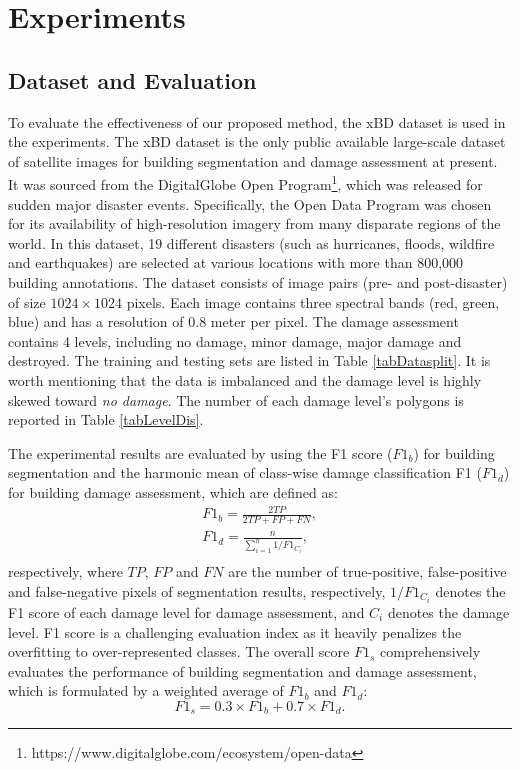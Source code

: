 \documentclass[journal]{IEEEtran}
\begin{document}
\section{Experiments}
\label{SecExp}
\subsection{Dataset and Evaluation}
To evaluate the effectiveness of our proposed method, the xBD dataset \cite{gupta2019xbd} is used in the experiments. The xBD dataset is the only public available large-scale dataset of satellite images for building segmentation and damage assessment at present. It was sourced from the DigitalGlobe Open Program\footnote{https://www.digitalglobe.com/ecosystem/open-data}, which was released for sudden major disaster events. Specifically, the Open Data Program was chosen for its availability of high-resolution imagery from many disparate regions of the world. In this dataset, 19 different disasters (such as hurricanes, floods, wildfire and earthquakes) are selected at various locations with more than 800,000 building annotations. The dataset consists of image pairs (pre- and post-disaster) of size $1024 \times 1024$ pixels. Each image contains three spectral bands (red, green, blue) and has a resolution of 0.8 meter per pixel. The damage assessment contains 4 levels, including no damage, minor damage, major damage and destroyed. The training and testing sets are listed in Table \ref{tabDatasplit}. It is worth mentioning that the data is imbalanced and the damage level is highly skewed toward \textit{no damage}. The number of each damage level's polygons is reported in Table \ref{tabLevelDis}.

The experimental results are evaluated by using the F1 score ($F1_b$) for building segmentation  and the harmonic mean of class-wise damage classification F1 ($F1_d$) for building damage assessment, which are defined as:
\begin{equation}
\begin{aligned}
F1_b = \frac{2TP}{2TP+FP+FN}, \\
F1_d = \frac{n}{\sum_{i=1}^{n}1/F1_{C_i}}, \\
\end{aligned}
\label{eqF1}
\end{equation}
respectively, where $TP$, $FP$ and $FN$ are the number of true-positive, false-positive and false-negative pixels of segmentation results, respectively, $ 1/F1_{C_i}$ denotes the F1 score of each damage level for damage assessment, and $C_i$ denotes the damage level. F1 score is a challenging evaluation index as it heavily penalizes the overfitting to over-represented classes. The overall score $F1_s$ \cite{gupta2019xbd} comprehensively evaluates the performance of building segmentation and damage assessment, which
is formulated by a weighted average of $F1_b$ and $F1_d$:
\begin{equation}
F1_s = 0.3 \times F1_b + 0.7 \times F1_d.
\label{eqOveral}
\end{equation}
\end{document}
